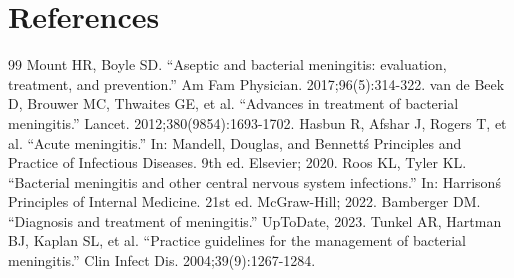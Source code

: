 \section*{References}
\begin{thebibliography}{99}
 Mount HR, Boyle SD. ``Aseptic and bacterial meningitis: evaluation, treatment, and prevention.'' Am Fam Physician. 2017;96(5):314-322.
 van de Beek D, Brouwer MC, Thwaites GE, et al. ``Advances in treatment of bacterial meningitis.'' Lancet. 2012;380(9854):1693-1702.
 Hasbun R, Afshar J, Rogers T, et al. ``Acute meningitis.'' In: Mandell, Douglas, and Bennett\'s Principles and Practice of Infectious Diseases. 9th ed. Elsevier; 2020.
 Roos KL, Tyler KL. ``Bacterial meningitis and other central nervous system infections.'' In: Harrison\'s Principles of Internal Medicine. 21st ed. McGraw-Hill; 2022.
 Bamberger DM. ``Diagnosis and treatment of meningitis.'' UpToDate, 2023.
 Tunkel AR, Hartman BJ, Kaplan SL, et al. ``Practice guidelines for the management of bacterial meningitis.'' Clin Infect Dis. 2004;39(9):1267-1284.
\end{thebibliography}
